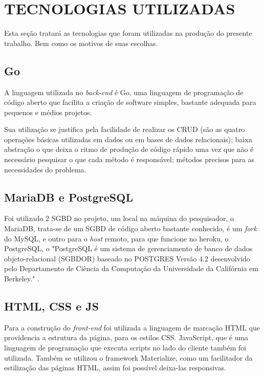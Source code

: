 \section{TECNOLOGIAS UTILIZADAS}

Esta seção tratará as tecnologias que foram utilizadas na produção do presente trabalho. Bem como os motivos de suas escolhas.

\subsection{Go}

A linguagem utilizada no \textit{back-end} é Go, uma linguagem de programação de código aberto que facilita a criação de software simples, bastante adequada para pequenos e médios projetos.

Sua utilização se justifica pela facilidade de realizar os CRUD (são as quatro operações básicas utilizadas em dados ou em bases de dados relacionais); baixa abstração o que deixa o ritmo de produção de código rápido uma vez que não é necessário pesquisar o que cada método é responsável; métodos precisos para as necessidades do problema.

\subsection{MariaDB e PostgreSQL}

Foi utilizado 2 SGBD no projeto, um local na máquina do pesquisador, o MariaDB, trata-se de um SGBD de código aberto bastante conhecido, é um \textit{fork} do MySQL, e outro para o \textit{host} remoto, para que funcione no heroku, o PostgreSQL, o "PostgreSQL é um sistema de gerenciamento de banco de dados objeto-relacional (SGBDOR) baseado no POSTGRES Versão 4.2 desenvolvido pelo Departamento de Ciência da Computação da Universidade da Califórnia em Berkeley."  \cite{postgres07}.

\subsection{HTML, CSS e JS}

Para a construção do \textit{front-end} foi utilizada a linguagem de marcação HTML que providencia a estrutura da página, para os estilos CSS. JavaScript, que é uma linguagem de programação que executa scripts no lado do cliente também foi utilizada. Também se utilizou o framework Materialize, como um facilitador da estilização das páginas HTML, assim foi possível deixa-las responsivas.

